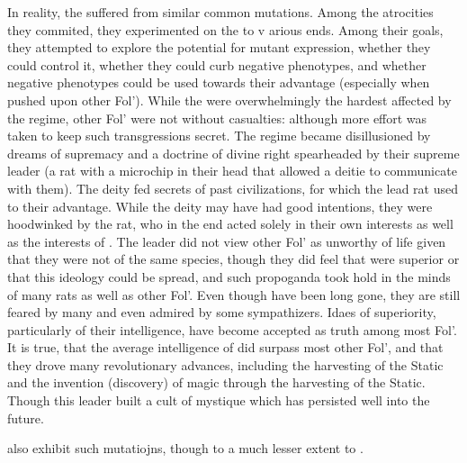 \documentclass[twoside, 12pt, letterpaper]{report}\usepackage[]{graphicx}\usepackage[]{color}
\begin{document}
\begin{multicols*}{2}
In reality, the \rat suffered from similar common mutations. Among the atrocities they commited, they experimented on the \mouse to v arious ends. Among their goals, they attempted to explore the potential for mutant expression, whether they could control it, whether they could curb negative phenotypes, and whether negative phenotypes could be used towards their advantage (especially when pushed upon other Fol'). While the \mouse were overwhelmingly the hardest affected by the \rat regime, other Fol' were not without casualties: although more effort was taken to keep such transgressions secret. The \rat regime became disillusioned by dreams of supremacy and a doctrine of divine right spearheaded by their supreme leader (a rat with a microchip in their head that allowed a deitie to communicate with them). The deity fed secrets of past civilizations, for which the lead rat used to their advantage. While the deity may have had good intentions, they were hoodwinked by the rat, who in the end acted solely in their own interests as well as the interests of \rat. The leader did not view other Fol' as unworthy of life given that they were not of the same species, though they did feel that \rat were superior or that this ideology could be spread, and such propoganda took hold in the minds of many rats as well as other Fol'. Even though \rat have been long gone, they are still feared by many and even admired by some sympathizers. Idaes of \rat superiority, particularly of their intelligence, have become accepted as truth among most Fol'. It is true, that the average intelligence of \rat did surpass most other Fol', and that they drove many revolutionary advances, including the harvesting of the Static and the invention (discovery) of magic through the harvesting of the Static. Though this leader built a cult of mystique which has persisted well into the future. 

\rabbit also exhibit such mutatiojns, though to a much lesser extent to \mouse.


\end{multicols*}
\end{document}
